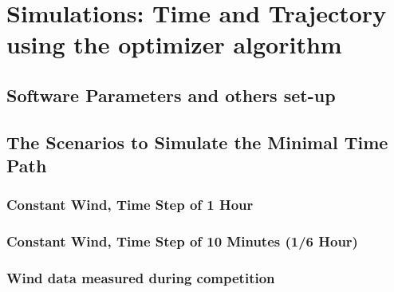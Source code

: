 \chapter{Simulations: Time and Trajectory using the optimizer algorithm}

\section{Software Parameters and others set-up}
\section{The Scenarios to Simulate the Minimal Time Path}
\subsection{Constant Wind, Time Step of 1 Hour}
\subsection{Constant Wind, Time Step of 10 Minutes (1/6 Hour)}
\subsection {Wind data measured during competition}
